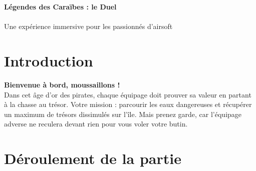 \documentclass{pirategame}
\begin{document}
\begin{titlepage}
    \centering
    \vspace*{0.5in}
    {\Huge \textbf{Légendes des Caraïbes : le Duel}}\\

    \vspace{0.5in}
    \\[1cm]
    \vspace{0.5in}
    {\Large Une expérience immersive pour les passionnés d'airsoft}
\end{titlepage}

\section{Introduction}
\textbf{Bienvenue à bord, moussaillons !} \\
Dans cet âge d'or des pirates, chaque équipage doit prouver sa valeur en partant à la chasse au trésor. Votre mission : parcourir les eaux dangereuses et récupérer un maximum de trésors dissimulés sur l'île. Mais prenez garde, car l'équipage adverse ne reculera devant rien pour vous voler votre butin.

\section{Déroulement de la partie}
\end{document}
